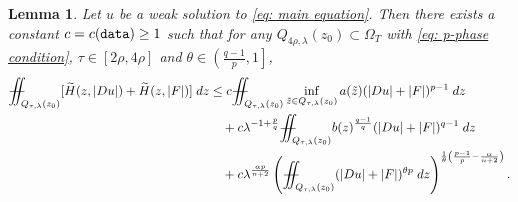 \documentclass[11pt,oneside, english,reqno,twoside a4paper]{amsart}
\newtheorem{lemma}{Lemma}[section]
\theoremstyle{definition}
\numberwithin{theorem}{section}
\numberwithin{equation}{section}
\newcommand{\iintss}{{\int\hspace{-0.28cm}\int}}
\newcommand{ \miints }{{\iintss\hspace{-0.56cm} -\hspace{-0.15cm}-}}
\newcommand{\miint}[1]{{\miints_{\hspace{-0.13cm}#1}}}
\begin{document}
\begin{lemma} \label{lem:p-phase1}
Let $u$ be a weak solution to \eqref{eq: main equation}. Then there exists a constant $c=c(\textnormal{\texttt{data}}) \geq 1$ such that for any $Q_{4\rho,\lambda}(z_0)\subset \Omega_T$ with \eqref{eq: p-phase condition}, $\tau \in [2\rho,4\rho]$ and $\theta \in \left(\frac{q-1}{p},1\right]$,
\begin{align*}
\miint{Q_{\tau,\lambda}(z_0)}[\widetilde{H}(z,|Du|)+\widetilde{H}(z,|F|)]\; d z &\leq c \miint{Q_{\tau,\lambda}(z_0)}\inf_{\tilde{z}\in Q_{\tau, \lambda}(z_0)}a(\tilde{z})(|D u|+|F|)^{p-1}\; dz\\
&\quad +c \lambda^{-1+\frac{p}{q}} \miint{Q_{\tau,\lambda}(z_0)} b(z)^{\frac{q-1}{q}}(|Du|+|F|)^{q-1}\; dz \\
&\quad +c\lambda^{\frac{\alpha p}{n+2}}\left(\miint{Q_{\tau,\lambda}(z_0)}(|Du|+|F|)^{\theta p} \;d z\right)^{\frac{1}{\theta}\left(\frac{p-1}{p}-\frac{\alpha}{n+2}\right)}.
\end{align*}
\end{lemma}
\end{document}
